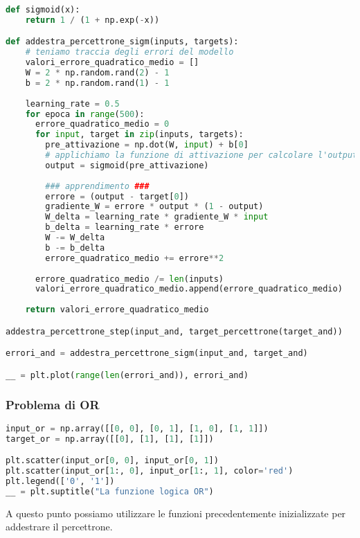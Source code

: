 \begin{lstlisting}[language=Python, caption=Funzione di Attivazione Sigmoidea e Output dei Risultati]
def sigmoid(x):
    return 1 / (1 + np.exp(-x))

def addestra_percettrone_sigm(inputs, targets):
    # teniamo traccia degli errori del modello  
    valori_errore_quadratico_medio = []  
    W = 2 * np.random.rand(2) - 1 
    b = 2 * np.random.rand(1) - 1
  
    learning_rate = 0.5
    for epoca in range(500):
      errore_quadratico_medio = 0
      for input, target in zip(inputs, targets):
        pre_attivazione = np.dot(W, input) + b[0]
        # applichiamo la funzione di attivazione per calcolare l'output
        output = sigmoid(pre_attivazione)  
  
        ### apprendimento ###
        errore = (output - target[0])
        gradiente_W = errore * output * (1 - output)
        W_delta = learning_rate * gradiente_W * input
        b_delta = learning_rate * errore
        W -= W_delta 
        b -= b_delta
        errore_quadratico_medio += errore**2
        
      errore_quadratico_medio /= len(inputs)
      valori_errore_quadratico_medio.append(errore_quadratico_medio)
    
    return valori_errore_quadratico_medio

addestra_percettrone_step(input_and, target_percettrone(target_and))

errori_and = addestra_percettrone_sigm(input_and, target_and)

__ = plt.plot(range(len(errori_and)), errori_and)
\end{lstlisting}

\subsubsection{Problema di OR}
\begin{lstlisting}[language=Python, caption=Inizializzazione]
input_or = np.array([[0, 0], [0, 1], [1, 0], [1, 1]])
target_or = np.array([[0], [1], [1], [1]])

plt.scatter(input_or[0, 0], input_or[0, 1])
plt.scatter(input_or[1:, 0], input_or[1:, 1], color='red')
plt.legend(['0', '1'])
__ = plt.suptitle("La funzione logica OR")
\end{lstlisting}

A questo punto possiamo utilizzare le funzioni precedentemente inizializzate per addestrare il percettrone.

